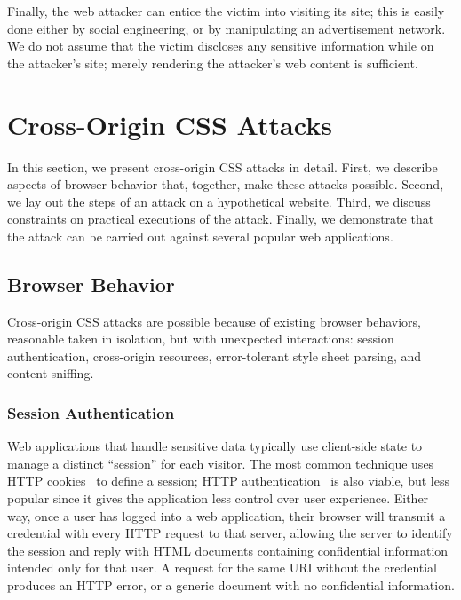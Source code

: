 \documentclass{acm_proc_article-sp}
\begin{document}
Finally, the web attacker can entice the victim into visiting its
site; this is easily done either by social engineering, or by
manipulating an advertisement network.  We do not assume that the
victim discloses any sensitive information while on the attacker's
site; merely rendering the attacker's web content is sufficient.

\section{Cross-Origin CSS Attacks} \label{sec:attacks}

In this section, we present cross-origin CSS attacks in detail.
First, we describe aspects of browser behavior that, together,
make these attacks possible.  Second, we lay out the steps of an
attack on a hypothetical website.  Third, we discuss constraints on
practical executions of the attack.  Finally, we demonstrate that the
attack can be carried out against several popular web applications.

\subsection{Browser Behavior}

Cross-origin CSS attacks are possible because of existing browser
behaviors, reasonable taken in isolation, but with unexpected
interactions: session authentication, cross-origin resources,
error-tolerant style sheet parsing, and content sniffing.

\subsubsection{Session Authentication}
Web applications that handle sensitive data typically use client-side
state to manage a distinct “session” for each visitor.  The most
common technique uses HTTP cookies~\cite{rfc2109,httpstate} to define
a session; HTTP authentication~\cite{rfc2617} is also viable, but less
popular since it gives the application less control over user
experience.  Either way, once a user has logged into a web
application, their browser will transmit a credential with every HTTP
request to that server, allowing the server to identify the session
and reply with HTML documents containing confidential information
intended only for that user.  A request for the same URI without the
credential produces an HTTP error, or a generic document with no
confidential information.
\end{document}
